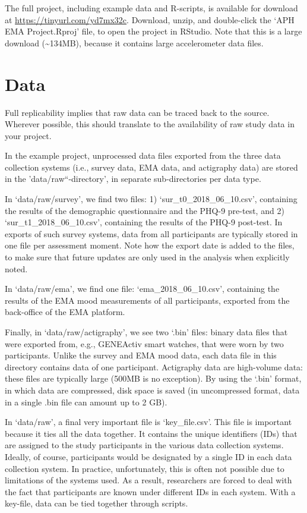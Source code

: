 \documentclass[]{book}
\begin{document}
The full project, including example data and R-scripts, is available for
download at \url{https://tinyurl.com/yd7mx32c}. Download, unzip, and
double-click the `APH EMA Project.Rproj' file, to open the project in
RStudio. Note that this is a large download (\textasciitilde{}134MB),
because it contains large accelerometer data files.

\section{Data}\label{data}


Full replicability implies that raw data can be traced back to the
source. Wherever possible, this should translate to the availability of
raw study data in your project.

In the example project, unprocessed data files exported from the three
data collection systems (i.e., survey data, EMA data, and actigraphy
data) are stored in the 'data/raw``-directory', in separate
sub-directories per data type.

In `data/raw/survey', we find two files: 1) `sur\_t0\_2018\_06\_10.csv',
containing the results of the demographic questionnaire and the PHQ-9
pre-test, and 2) `sur\_t1\_2018\_06\_10.csv', containing the results of
the PHQ-9 post-test. In exports of such survey systems, data from all
participants are typically stored in one file per assessment moment.
Note how the export date is added to the files, to make sure that future
updates are only used in the analysis when explicitly noted.

In `data/raw/ema', we find one file: `ema\_2018\_06\_10.csv', containing
the results of the EMA mood measurements of all participants, exported
from the back-office of the EMA platform.

Finally, in `data/raw/actigraphy', we see two `.bin' files: binary data
files that were exported from, e.g., GENEActiv smart watches, that were
worn by two participants. Unlike the survey and EMA mood data, each data
file in this directory contains data of one participant. Actigraphy data
are high-volume data: these files are typically large (500MB is no
exception). By using the `.bin' format, in which data are compressed,
disk space is saved (in uncompressed format, data in a single .bin file
can amount up to 2 GB).

In `data/raw', a final very important file is `key\_file.csv'. This file
is important because it ties all the data together. It contains the
unique identifiers (IDs) that are assigned to the study participants in
the various data collection systems. Ideally, of course, participants
would be designated by a single ID in each data collection system. In
practice, unfortunately, this is often not possible due to limitations
of the systems used. As a result, researchers are forced to deal with
the fact that participants are known under different IDs in each system.
With a key-file, data can be tied together through scripts.
\end{document}
